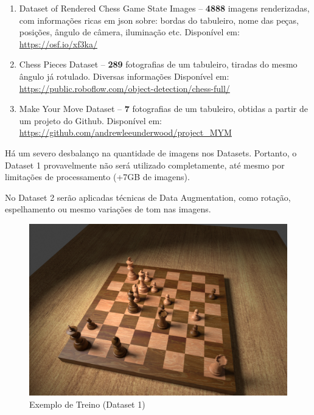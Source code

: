 \documentclass[a4paper,12pt,twoside]{article}
\begin{document}
\begin{enumerate}
    \item{Dataset of Rendered Chess Game State Images – 
          \textbf{4888} imagens renderizadas, com informações ricas em json sobre: bordas do tabuleiro, nome das peças, posições, ângulo de câmera, iluminação etc. 
                        Disponível em: \url{https://osf.io/xf3ka/}}
    \item{Chess Pieces Dataset – 
          \textbf{289} fotografias de um tabuleiro, tiradas do mesmo ângulo já rotulado. Diversas informações 
                        Disponível em: \url{https://public.roboflow.com/object-detection/chess-full/}}
    \item{Make Your Move Dataset – 
          \textbf{7} fotografias de um tabuleiro, obtidas a partir de um projeto do Github. 
                        Disponível em: \url{https://github.com/andrewleeunderwood/project\_MYM}}
\end{enumerate}

Há um severo desbalanço na quantidade de imagens nos Datasets. Portanto, o Dataset 1 provavelmente não será utilizado completamente, até mesmo por limitações de processamento (+7GB de imagens).

No Dataset 2 serão aplicadas técnicas de Data Augmentation, como rotação, espelhamento ou mesmo variações de tom nas imagens.

\begin{figure}[h!]
\centering
  \includegraphics[width=\linewidth]{fig/treino.jpg}
\caption{Exemplo de Treino (Dataset 1)}
\label{fig:treino}
\end{figure}
\end{document}
